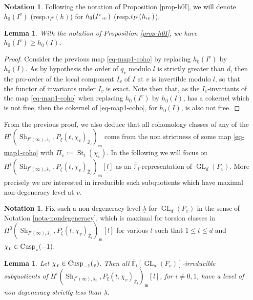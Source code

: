 \documentclass[11pt]{article}
\makeatletter
\newcommand{\resp}{resp.\xspace}
\DeclareRobustCommand{\mathbbm}[1]{\csname jepbb@#1\endcsname}
\let\mathds\mathbbm
\DeclareMathOperator{\GL}{GL}
\theoremstyle{plain}
\newtheorem{lemma}[equation]{Lemma}
\theoremstyle{definition}
\newtheorem{nota}[equation]{Notation}
\numberwithin{equation}{subsection}
\newcommand\Fm{{\mathbb F}}
\newcommand\Zm{{\mathbb Z}}
\DeclareMathOperator{\sh}{Sh}
\DeclareMathOperator{\cusp}{Cusp}
\DeclareMathOperator{\st}{St}
\let \oo=\infty
\makeatother
\begin{document}
\begin{nota} \label{nota-h0I}
Following the notation of Proposition \ref{prop-h0I}, we will
denote $h_0(I^v)$ (\resp $i_{I^v}(h)$) for $h_0(I^v,\mathds 1_v)$
(\resp $i_{I^v}(h,\mathds 1_v)$).
\end{nota}

\begin{lemma} \label{lem-iIv}
With the notation of Proposition \ref{prop-h0I}, we have $h_0(I^v) \geq h_0(I)$.
\end{lemma}

\begin{proof}
Consider the previous map \eqref{eq-map1-coho} by replacing $h_0(I^v)$ by $h_0(I)$.
As by hypothesis the order of $q_v$ modulo $l$ is strictly greater than $d$,
then the
pro-order of the local component $I_v$ of $I$ at $v$
is invertible modulo $l$, so that the functor of invariants under $I_v$ is exact.
Note then that, as the $I_v$-invariants of the map \eqref{eq-map1-coho} when
replacing $h_0(I^v)$ by $h_0(I)$, has a cokernel which is not free, then the cokernel
of \eqref{eq-map1-coho}, for $h_0(I)$, is also not free.
\end{proof}

From the previous proof, we also deduce that all cohomology classes of any of
the $H^i(\sh_{I^{v}(\oo),\bar s_v},P_\xi(t,\chi_v)_{\overline \Zm_l})_{\mathfrak m}$ come
from the non strictness of some map \eqref{eq-map1-coho} with $\Pi_v:=\st_t(\chi_v)$. In the following we will focus
on $H^i(\sh_{I^{v}(\oo),\bar s_v},P_\xi(t,\chi_v)_{\overline \Zm_l})_{\mathfrak m}[l]$ as an $\overline \Fm_l$-representation of $\GL_d(F_v)$.
More precisely we are interested in irreducible such subquotients which have
maximal non-degeneracy level at $v$.

\begin{nota}
Fix such a non degeneracy level $\underline{\lambda}$ for $\GL_d(F_v)$
in the sense of Notation \ref{nota-nondegeneracy}, which is maximal for torsion classes
in $H^0(\sh_{I^{v}(\oo),\bar s_v},P_\xi(t,\chi_v)_{\overline \Zm_l})_{\mathfrak m}[l]$ for various $t$ such that $1 \leq t \leq d$ and $\chi_v \in \cusp_{\mathds 1_v}(-1)$.
\end{nota}

\begin{lemma} \label{lem-rem-after1}
Let $\chi_v \in \cusp_{-1}(\mathds 1_v)$.
Then all $\overline \Fm_l[\GL_d(F_v)]$-irreducible subquotients of
$H^i(\sh_{I^{v}(\oo),\bar s_v},P_\xi(t,\chi_v)_{\overline \Zm_l})_{\mathfrak m}[l]$, for $i\neq 0,1$,
have a level of
non degeneracy strictly less than $\underline{\lambda}$.
\end{lemma}
\end{document}
